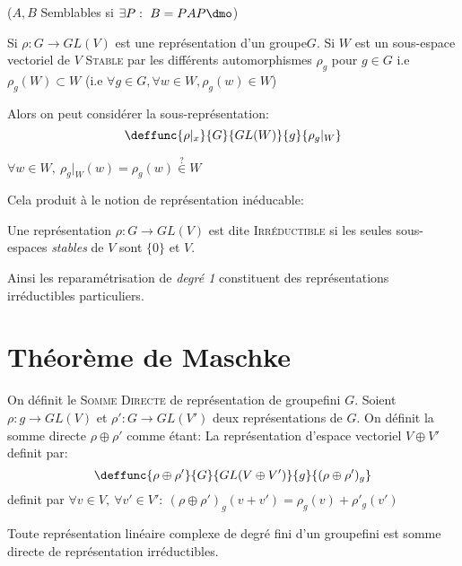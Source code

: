 ($A,B$ Semblables si $\exists P:\ B=PAP\dmo$)

Si $\rho:G\rightarrow GL(V)$ est une représentation d'un groupe$G$. Si $W$ est un sous-espace vectoriel de $V$ \textsc{Stable} par les différents automorphismes $\rho_g$ pour $g\in G$ i.e $\rho_g(W)\subset W$ (i.e $\forall g\in G, \forall w\in W, \rho_g(w)\in W$)

Alors on peut considérer la sous-représentation:
$$\deffunc{\rho|_x}{G}{GL(W)}{g}{\rho_g|_W}$$

\begin{remark}
	$\forall w\in W,\ \rho_g|_W(w)=\rho_g(w)\overset{?}{\in}W$
\end{remark}
Cela produit à le notion de représentation inéducable:
\begin{definition}
	Une représentation $\rho: G\rightarrow  GL(V)$ est dite \textsc{Irréductible} si les seules sous-espaces \emph{stables} de $V$ sont $\{0\}$ et $V$.
\end{definition}

Ainsi les reparamétrisation de \emph{degré 1} constituent des représentations irréductibles particuliers.

\section{Théorème de Maschke}
\begin{definition}
	On définit le \textsc{Somme Directe} de représentation de groupefini $G$. Soient $\rho:g\rightarrow GL(V)$ et $\rho': G\rightarrow GL(V')$ deux représentations de $G$. On définit la somme directe $\rho\oplus \rho'$ comme étant:
	La représentation d'espace vectoriel $V\oplus V'$ definit par:
	$$\deffunc{\rho\oplus\rho'}{G}{GL(V\oplus V')}{g}{(\rho\oplus\rho')_g}$$ definit par $\forall v\in V,\ \forall v'\in V':\  (\rho\oplus \rho')_g(v+v')=\rho_g(v)+\rho'_g(v')$
\end{definition}

\begin{theorem}	
	Toute représentation linéaire complexe de degré fini d'un groupefini est somme directe de représentation irréductibles.
\end{theorem}

